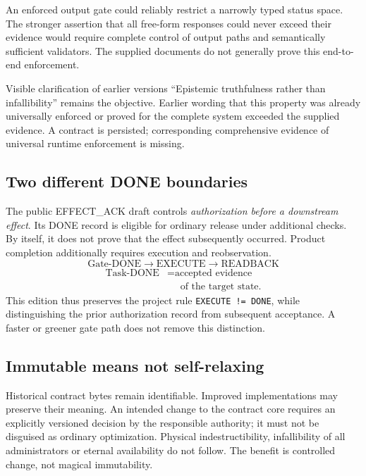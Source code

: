 \begin{cols}
An enforced output gate could reliably restrict a narrowly typed status space. The stronger assertion that all free-form responses could never exceed their evidence would require complete control of output paths and semantically sufficient validators. The supplied documents do not generally prove this end-to-end enforcement.

\begin{boundary}{Visible clarification of earlier versions}
``Epistemic truthfulness rather than infallibility'' remains the objective. Earlier wording that this property was already universally enforced or proved for the complete system exceeded the supplied evidence. A contract is persisted; corresponding comprehensive evidence of universal runtime enforcement is missing.
\end{boundary}

\subsection*{Two different DONE boundaries}
The public EFFECT\_ACK draft controls \emph{authorization before a downstream effect}. Its DONE record is eligible for ordinary release under additional checks. By itself, it does not prove that the effect subsequently occurred. Product completion additionally requires execution and reobservation. 
\[
\text{Gate-DONE}\to\text{EXECUTE}\to\text{READBACK}
\]
\[
\begin{aligned}
\text{Task-DONE}&=\text{accepted evidence}\\
&\phantom{=}\text{of the target state}.
\end{aligned}
\]
This edition thus preserves the project rule \texttt{EXECUTE != DONE}, while distinguishing the prior authorization record from subsequent acceptance. A faster or greener gate path does not remove this distinction.

\subsection*{Immutable means not self-relaxing}
Historical contract bytes remain identifiable. Improved implementations may preserve their meaning. An intended change to the contract core requires an explicitly versioned decision by the responsible authority; it must not be disguised as ordinary optimization. Physical indestructibility, infallibility of all administrators or eternal availability do not follow. The benefit is controlled change, not magical immutability.
\end{cols}

